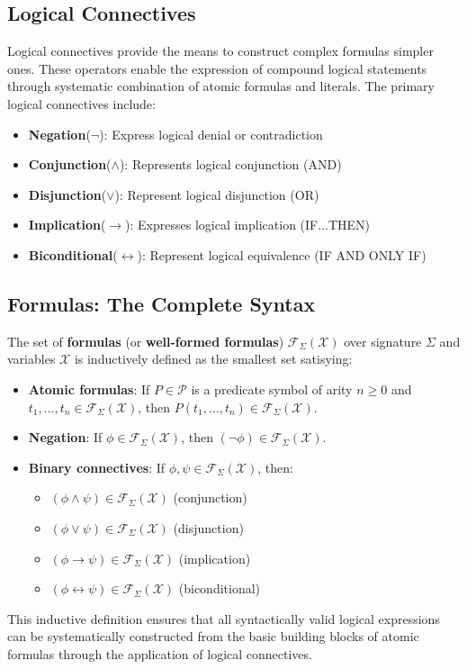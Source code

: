 \documentclass[a4paper]{article}
\theoremstyle{definition}
\begin{document}
\subsection{Logical Connectives}
Logical connectives provide the means to construct complex formulas simpler ones. These operators
enable the expression of compound logical statements through systematic combination of atomic formulas and literals.
\vspace{1em}
\noindent
\newline
The primary logical connectives include:
\begin{itemize}
	\item \textbf{Negation}(\( \lnot \)): Express logical denial or contradiction 
	\item \textbf{Conjunction}(\( \wedge\)): Represents logical conjunction (AND) 
	\item \textbf{Disjunction}(\( \vee \)): Represent logical disjunction (OR)
	\item \textbf{Implication}(\( \rightarrow \)): Expresses logical implication (IF...THEN)
	\item \textbf{Biconditional}(\( \leftrightarrow \)): Represent logical equivalence (IF AND ONLY IF) 
\end{itemize}
\subsection{Formulas: The Complete Syntax}
The set of \textbf{formulas} (or \textbf{well-formed formulas}) \( \mathcal{F}_{\Sigma} (\mathcal{X}) \) over signature \( \Sigma \) and variables \( \mathcal{X} \) is 
inductively defined as the smallest set satisying:
\begin{itemize}
	\item \textbf{Atomic formulas}: If \( P \in \mathcal{P} \) is a predicate symbol of arity \( n \geq 0 \) and \( t_1, \ldots, t_n \in \mathcal{F}_{\Sigma} (\mathcal{X}) \), then \( P(t_1, \ldots, t_n) \in \mathcal{F}_{\Sigma} (\mathcal{X}) \).
	\item \textbf{Negation}: If \( \phi \in \mathcal{F}_{\Sigma} (\mathcal{X}) \), then \( (\lnot \phi) \in \mathcal{F}_{\Sigma} (\mathcal{X}) \). 
	\item \textbf{Binary connectives}: If \( \phi, \psi \in \mathcal{F}_{\Sigma} (\mathcal{X}) \), then:
	\begin{itemize}
		\item \( (\phi \wedge \psi) \in \mathcal{F}_{\Sigma} (\mathcal{X}) \) (conjunction)
		\item \( (\phi \vee \psi) \in \mathcal{F}_{\Sigma} (\mathcal{X}) \) (disjunction)
		\item \( (\phi \rightarrow \psi) \in \mathcal{F}_{\Sigma} (\mathcal{X}) \) (implication)
		\item \( (\phi \leftrightarrow \psi) \in \mathcal{F}_{\Sigma} (\mathcal{X}) \) (biconditional)
	\end{itemize}
\end{itemize}
This inductive definition ensures that all syntactically valid logical expressions can be systematically constructed 
from the basic building blocks of atomic formulas through the application 
of logical connectives.
\end{document}
